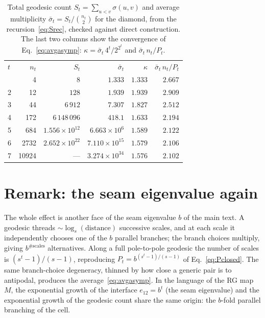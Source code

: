 \documentclass[aps,pre,onecolumn,superscriptaddress,floatfix]{revtex4-2}
\begin{document}
\begin{table}[t]
  \caption{Total geodesic count $S_t=\sum_{u<v}\sigma(u,v)$ and average
  multiplicity $\bar\sigma_t=S_t/\binom{n_t}{2}$ for the diamond, from the
  recursion~\eqref{eq:Srec}, checked against direct construction. The last two
  columns show the convergence of Eq.~\eqref{eq:avgasymp}:
  $\kappa=\bar\sigma_t\,4^{t}/2^{2^{t}}$ and $\bar\sigma_t\,n_t/P_t$.}
  \label{tab:avg}
  \begin{ruledtabular}
  \begin{tabular}{lrrrrr}
    $t$ & $n_t$ & $S_t$ & $\bar\sigma_t$ & $\kappa$ & $\bar\sigma_t\,n_t/P_t$\\
    \colrule
    1 & 4     & $8$                              & $1.333$              & $1.333$ & $2.667$\\
    2 & 12    & $128$                            & $1.939$              & $1.939$ & $2.909$\\
    3 & 44    & $6\,912$                         & $7.307$              & $1.827$ & $2.512$\\
    4 & 172   & $6\,148\,096$                    & $418.1$              & $1.633$ & $2.194$\\
    5 & 684   & $1.556\times10^{12}$             & $6.663\times10^{6}$  & $1.589$ & $2.122$\\
    6 & 2732  & $2.652\times10^{22}$             & $7.110\times10^{15}$ & $1.579$ & $2.106$\\
    7 & 10924 & ---                              & $3.274\times10^{34}$ & $1.576$ & $2.102$\\
  \end{tabular}
  \end{ruledtabular}
\end{table}

\section{Remark: the seam eigenvalue again}
\label{sec:remark}

The whole effect is another face of the seam eigenvalue $b$ of the main text. A
geodesic threads $\sim\log_s(\text{distance})$ successive scales, and at each
scale it independently chooses one of the $b$ parallel branches; the branch
choices multiply, giving $b^{\#\text{scales}}$ alternatives. Along a full
pole-to-pole geodesic the number of scales is $(s^{t}-1)/(s-1)$, reproducing
$P_t=b^{(s^{t}-1)/(s-1)}$ of Eq.~\eqref{eq:Pclosed}. The same branch-choice
degeneracy, thinned by how close a generic pair is to antipodal, produces the
average~\eqref{eq:avgasymp}. In the language of the RG map $M$, the exponential
growth of the interface $e_{12}=b^{t}$ (the seam eigenvalue) and the exponential
growth of the geodesic count share the same origin: the $b$-fold parallel
branching of the cell.
\end{document}
